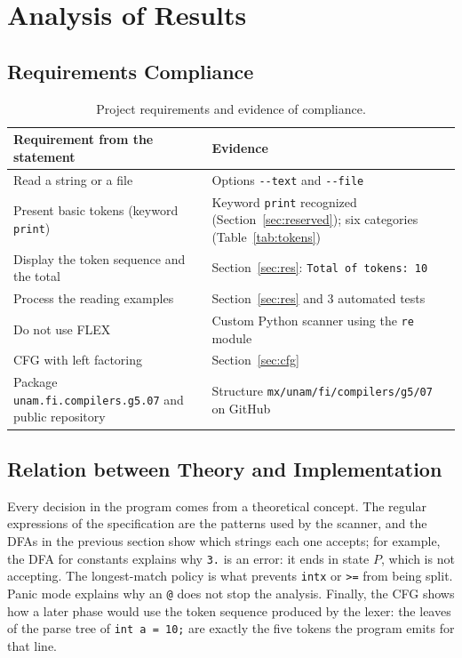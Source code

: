\documentclass[11pt,letterpaper]{article}
\newcommand{\tok}[1]{\texttt{#1}}
\begin{document}
\newpage
\section{Analysis of Results}

\subsection{Requirements Compliance}

\begin{table}[H]
\centering
\small
\begin{tabularx}{\linewidth}{@{}>{\raggedright\arraybackslash}X >{\raggedright\arraybackslash}p{6.5cm}@{}}
\toprule
\textbf{Requirement from the statement} & \textbf{Evidence} \\
\midrule
Read a string or a file & Options \tok{-{}-text} and \tok{-{}-file} \\
Present basic tokens (keyword \tok{print}) & Keyword \tok{print} recognized (Section~\ref{sec:reserved}); six categories (Table~\ref{tab:tokens}) \\
Display the token sequence and the total & Section~\ref{sec:res}: \tok{Total of tokens: 10} \\
Process the reading examples & Section~\ref{sec:res} and 3 automated tests \\
Do not use FLEX & Custom Python scanner using the \tok{re} module \\
CFG with left factoring & Section~\ref{sec:cfg} \\
Package \tok{unam.fi.compilers.g5.07} and public repository & Structure \tok{mx/unam/fi/compilers/g5/07} on GitHub \\
\bottomrule
\end{tabularx}
\caption{Project requirements and evidence of compliance.}
\end{table}

\subsection{Relation between Theory and Implementation}

Every decision in the program comes from a theoretical concept. The regular
expressions of the specification are the patterns used by the scanner, and
the DFAs in the previous section show which strings each one accepts; for
example, the DFA for constants explains why \tok{3.} is an error: it ends in
state $P$, which is not accepting. The longest-match policy is what prevents
\tok{intx} or \tok{>=} from being split. Panic mode explains why an \tok{@}
does not stop the analysis. Finally, the CFG shows how a later phase would use
the token sequence produced by the lexer: the leaves of the parse tree of
\tok{int a = 10;} are exactly the five tokens the program emits for that line.
\end{document}
